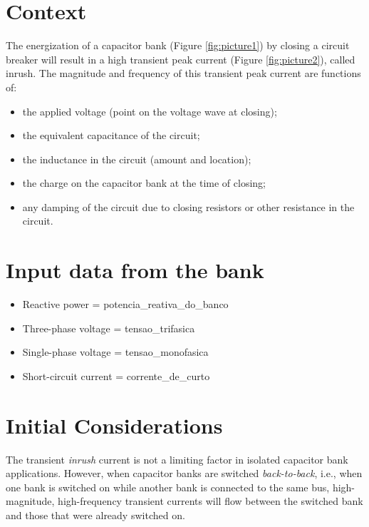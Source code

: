 \documentclass[a4paper]{article}
\begin{document}
	
	\section{Context}
	The energization of a capacitor bank (Figure \ref{fig:picture1}) by closing a circuit breaker will result in a high transient peak current (Figure \ref{fig:picture2}), called inrush. The magnitude and frequency of this transient peak current are functions of:
	\begin{itemize}[label=\textendash]
		\item the applied voltage (point on the voltage wave at closing);
		\item the equivalent capacitance of the circuit;
		\item the inductance in the circuit (amount and location);
		\item the charge on the capacitor bank at the time of closing;
		\item any damping of the circuit due to closing resistors or other resistance in the circuit.
	\end{itemize}
	
	\section{Input data from the bank}
	\begin{itemize}[label=\textendash]
		\item Reactive power  = {{potencia_reativa_do_banco}}
		\item Three-phase voltage  = {{tensao_trifasica}}
		\item Single-phase voltage  = {{tensao_monofasica}}
		\item Short-circuit current  = {{corrente_de_curto}}
	\end{itemize}
	
	\begin{center}
	\end{center}
	
	
	
	\section{Initial Considerations}
	
	The transient \textit{inrush} current is not a limiting factor in isolated capacitor bank applications. However, when capacitor banks are switched \textit{back-to-back}, i.e., when one bank is switched on while another bank is connected to the same bus, high-magnitude, high-frequency transient currents will flow between the switched bank and those that were already switched on.
	
\end{document}
